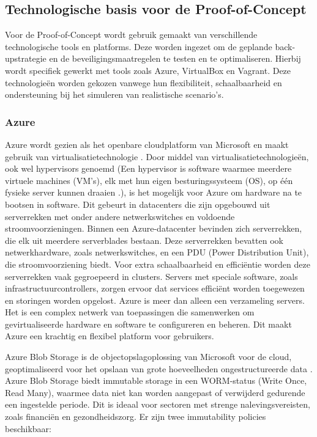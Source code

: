 \subsection{Technologische basis voor de Proof-of-Concept}
Voor de Proof-of-Concept wordt gebruik gemaakt van verschillende technologische tools en platforms. Deze worden ingezet om de geplande back-upstrategie en de beveiligingsmaatregelen te testen en te optimaliseren. Hierbij wordt specifiek gewerkt met tools zoals Azure, VirtualBox en Vagrant. Deze technologieën worden gekozen vanwege hun flexibiliteit, schaalbaarheid en ondersteuning bij het simuleren van realistische scenario's.
\subsubsection{Azure}
Azure wordt gezien als het openbare cloudplatform van Microsoft en maakt gebruik van virtualisatietechnologie \autocite{Ekuan2023}. Door middel van virtualisatietechnologieën, ook wel hypervisors genoemd (Een hypervisor is software waarmee meerdere virtuele machines (VM's), elk met hun eigen besturingssysteem (OS), op één fysieke server kunnen draaien \autocite{Susnjara2024}.), is het mogelijk voor Azure om hardware na te bootsen in software. Dit gebeurt in datacenters die zijn opgebouwd uit serverrekken met onder andere netwerkswitches en voldoende stroomvoorzieningen. Binnen een Azure-datacenter bevinden zich serverrekken, die elk uit meerdere serverblades bestaan. Deze serverrekken bevatten ook netwerkhardware, zoals netwerkswitches, en een PDU (Power Distribution Unit), die stroomvoorziening biedt. Voor extra schaalbaarheid en efficiëntie worden deze serverrekken vaak gegroepeerd in clusters. Servers met speciale software, zoals infrastructuurcontrollers, zorgen ervoor dat services efficiënt worden toegewezen en storingen worden opgelost. Azure is meer dan alleen een verzameling servers. Het is een complex netwerk van toepassingen die samenwerken om gevirtualiseerde hardware en software te configureren en beheren. Dit maakt Azure een krachtig en flexibel platform voor gebruikers.

Azure Blob Storage is de objectopslagoplossing van Microsoft voor de cloud, geoptimaliseerd voor het opslaan van grote hoeveelheden ongestructureerde data \autocite{Dubey2023}. Azure Blob Storage biedt immutable storage in een WORM-status (Write Once, Read Many), waarmee data niet kan worden aangepast of verwijderd gedurende een ingestelde periode. Dit is ideaal voor sectoren met strenge nalevingsvereisten, zoals financiën en gezondheidszorg.  Er zijn twee immutability policies beschikbaar:

